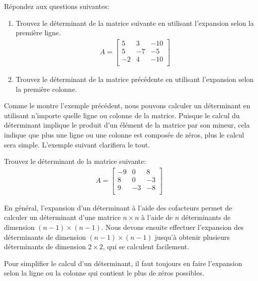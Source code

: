 \documentclass[]{book}
\providecommand{\tightlist}{%
  \setlength{\itemsep}{0pt}\setlength{\parskip}{0pt}}
\theoremstyle{definition}
\theoremstyle{definition}
\theoremstyle{definition}
\theoremstyle{remark}
\let\BeginKnitrBlock\begin \let\EndKnitrBlock\end
\begin{document}
\BeginKnitrBlock{example}
\protect\hypertarget{exm:unnamed-chunk-97}{}{\label{exm:unnamed-chunk-97} }Répondez aux questions suivantes:

\begin{enumerate}
\def\labelenumi{\alph{enumi}.}
\tightlist
\item
  Trouvez le déterminant de la matrice suivante en utilisant l'expansion selon la première ligne.
  \begin{align*}
  A=\begin{bmatrix}
  5&3&-10\\
  5&-7&-5\\
  -2&4&-10\\
  \end{bmatrix}
  \end{align*}
\item
  Trouvez le déterminant de la matrice précédente en utilisant l'expansion selon la première colonne.
\end{enumerate}
\EndKnitrBlock{example}

Comme le montre l'exemple précédent, nous pouvons calculer un déterminant en utilisant n'importe quelle ligne ou colonne de la matrice. Puisque le calcul du déterminant implique le produit d'un élément de la matrice par son mineur, cela indique que plus une ligne ou une colonne est composée de zéros, plus le calcul sera simple. L'exemple suivant clarifiera le tout.

\BeginKnitrBlock{example}
\protect\hypertarget{exm:unnamed-chunk-98}{}{\label{exm:unnamed-chunk-98} }Trouvez le déterminant de la matrice suivante:
\begin{align*}
A = \begin{bmatrix}
-9&0&8\\
8&0&-3\\
9&-3&-8\\
\end{bmatrix}
\end{align*}
\EndKnitrBlock{example}

En général, l'expansion d'un déterminant à l'aide des cofacteurs permet de calculer un déterminant d'une matrice \(n\times n\) à l'aide de \(n\) déterminants de dimension \((n-1)\times (n-1)\). Nous devons ensuite effectuer l'expansion des déterminants de dimension \((n-1)\times (n-1)\) jusqu'à obtenir plusieurs déterminants de dimension \(2\times 2\), qui se calculent facilement.

\BeginKnitrBlock{remark}
{}Pour simplifier le calcul d'un déterminant, il faut toujours en faire l'expansion selon la ligne ou la colonne qui contient le plus de zéros possibles.
\EndKnitrBlock{remark}
\end{document}
